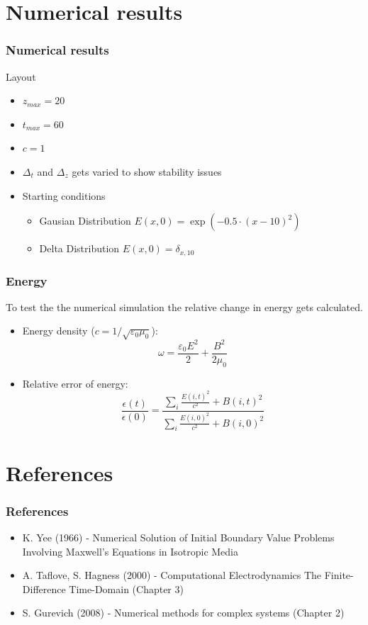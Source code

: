 \documentclass[ignorenonframetext]{beamer}
\begin{document}
\section{Numerical results}
\begin{frame}
\frametitle{Numerical results}
Layout
\begin{itemize}

\item $z_{max} = 20$
\item $t_{max} = 60$
\item $c = 1$
\item $\Delta_t$ and $\Delta_z$ gets varied to show stability issues
\item Starting conditions
\begin{itemize}
\item Gausian Distribution $E(x,0) = \exp(-0.5\cdot(x-10)^2)$
\item Delta Distribution $E(x,0) = \delta_{x, 10}$
\end{itemize} 
\end{itemize}
\end{frame}


\begin{frame}
\frametitle{Energy}
To test the the numerical simulation the relative change in energy gets calculated.
\begin{itemize}
\item Energy density ($c = 1/\sqrt{\varepsilon_0\mu_0}$):
\begin{equation}
\omega = \frac{\varepsilon_0 E^2}{2} + \frac{B^2}{2 \mu_0}
\end{equation}
\item Relative error of energy:
\begin{equation}
\frac{\epsilon(t)}{\epsilon(0)} =  \frac{\sum_i\frac{E(i,t)^2}{c^2} + B(i,t)^2}
												{\sum_i\frac{E(i,0)^2}{c^2} + B(i,0)^2}
\end{equation} 
\end{itemize}
\end{frame}

\section{References}
\begin{frame}
\frametitle{References}
\begin{itemize}

\item K. Yee (1966) - Numerical Solution of Initial Boundary Value Problems Involving Maxwell’s Equations in Isotropic Media 
\item A. Taflove, S. Hagness (2000) - Computational Electrodynamics The Finite-Difference Time-Domain (Chapter 3) 
\item S. Gurevich (2008) - Numerical methods for complex systems (Chapter 2) 
\end{itemize}
\end{frame}

\end{document}
